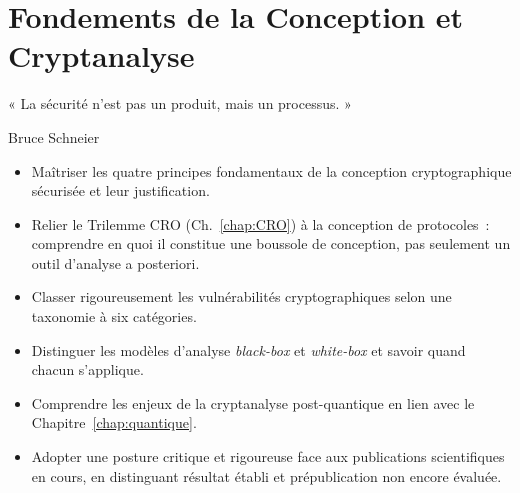
\chapter{Fondements de la Conception et Cryptanalyse}
\label{chap:cryptanal}

\epigraph{%
    « La sécurité n'est pas un produit, mais un processus. »%
}{Bruce Schneier}


\begin{boxobjectifs}
\begin{itemize}
    \item Maîtriser les quatre principes fondamentaux de la conception
          cryptographique sécurisée et leur justification.
    \item Relier le Trilemme CRO (Ch.~\ref{chap:CRO}) à la conception
          de protocoles~: comprendre en quoi il constitue une boussole
          de conception, pas seulement un outil d'analyse a posteriori.
    \item Classer rigoureusement les vulnérabilités cryptographiques
          selon une taxonomie à six catégories.
    \item Distinguer les modèles d'analyse \textit{black-box} et
          \textit{white-box} et savoir quand chacun s'applique.
    \item Comprendre les enjeux de la cryptanalyse post-quantique
          en lien avec le Chapitre~\ref{chap:quantique}.
    \item Adopter une posture critique et rigoureuse face aux
          publications scientifiques en cours, en distinguant
          résultat établi et prépublication non encore évaluée.
\end{itemize}
\end{boxobjectifs}

\bigskip

